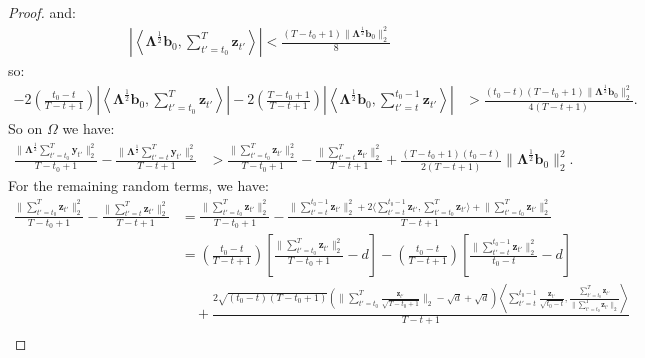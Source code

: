 \begin{proof}
and:
\begin{align*}
    \left|\left\langle\boldsymbol{\Lambda}^{\frac{1}{2}}\mathbf{b}_0, \sum_{t'=t_0}^T \mathbf{z}_{t'} \right\rangle\right| < \frac{(T-t_0+1) \lVert\boldsymbol{\Lambda}^{\frac{1}{2}} \mathbf{b}_0\rVert_2^2}{8}
\end{align*}
so:
\begin{align*}
    - 2\left(\frac{t_0 - t}{T-t+1}\right)\left|\left\langle \boldsymbol{\Lambda}^{\frac{1}{2}}\mathbf{b}_0, \sum_{t'=t_0}^T\mathbf{z}_{t'}\right\rangle\right| - 2\left(\frac{T-t_0+1}{T-t+1}\right)\left|\left\langle \boldsymbol{\Lambda}^{\frac{1}{2}}\mathbf{b}_0, \sum_{t'=t}^{t_0-1}\mathbf{z}_{t'}\right\rangle\right| 
    &> \frac{(t_0-t)(T-t_0+1)\lVert\boldsymbol{\Lambda}^{\frac{1}{2}} \mathbf{b}_0\rVert_2^2}{4(T-t+1)}.
\end{align*}
So on $\Omega$ we have:
\begin{align*}
    \frac{\lVert\boldsymbol{\Lambda}^{\frac{1}{2}} \sum_{t'=t_0}^T\mathbf{y}_{t'}\rVert_2^2}{T-t_0+1} - \frac{\lVert\boldsymbol{\Lambda}^{\frac{1}{2}} \sum_{t'=t}^T\mathbf{y}_{t'}\rVert_2^2}{T-t+1} &> \frac{\lVert \sum_{t'=t_0}^T\mathbf{z}_{t'}\rVert_2^2}{T-t_0+1} - \frac{\lVert\sum_{t'=t}^T\mathbf{z}_{t'}\rVert_2^2}{T-t+1} + \frac{(T-t_0+1)(t_0 - t) }{2(T-t+1)}\lVert\boldsymbol{\Lambda}^{\frac{1}{2}} \mathbf{b}_0\rVert^2_2 .
\end{align*}
For the remaining random terms, we have:
\small
\begin{align*}
    \frac{\lVert\sum_{t'=t_0}^T\mathbf{z}_{t'}\rVert_2^2}{T-t_0+1} - \frac{\lVert\sum_{t'=t}^T\mathbf{z}_{t'}\rVert_2^2}{T-t+1} &= \frac{\lVert\sum_{t'=t_0}^T\mathbf{z}_{t'}\rVert_2^2}{T-t_0+1} - 
    \frac{\lVert\sum_{t'=t}^{t_0-1}\mathbf{z}_{t'}\rVert_2^2 + 2\langle \sum_{t'=t}^{t_0-1}\mathbf{z}_{t'}, \sum_{t'=t_0}^{T}\mathbf{z}_{t'}\rangle + \lVert\sum_{t'=t_0}^{T}\mathbf{z}_{t'}\rVert_2^2}{T-t+1} \\
    &= \left(\frac{t_0-t}{T-t+1}\right)\left[\frac{\lVert\sum_{t'=t_0}^T\mathbf{z}_{t'}\rVert_2^2}{T-t_0 + 1} - d\right] - \left(\frac{t_0-t}{T-t+1}\right)\left[\frac{\lVert\sum_{t'=t}^{t_0-1}\mathbf{z}_{t'}\rVert_2^2}{t_0-t} -d \right] \\
    &\quad +\frac{2\sqrt{(t_0-t)(T-t_0+1)}\left(\lVert\sum_{t'=t_0}^{T}\frac{\mathbf{z}_{t'}}{\sqrt{T-t_0+1}}\rVert_2 -\sqrt{d} + \sqrt{d}\right)\left\langle \sum_{t'=t}^{t_0-1}\frac{\mathbf{z}_{t'}}{\sqrt{t_0-t}}, \frac{\sum_{t'=t_0}^{T}\mathbf{z}_{t'}}{\lVert\sum_{t'=t_0}^{T}\mathbf{z}_{t'}\rVert_2}\right\rangle}{T-t+1} \\

\end{align*}
\end{proof}
